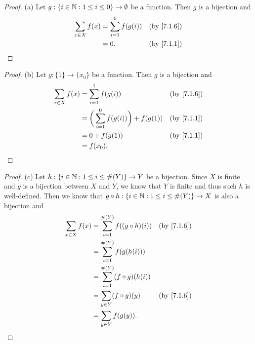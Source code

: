 \begin{proof}{(a)}
  Let \(g : \{i \in \mathbb{N} : 1 \leq i \leq 0\} \to \emptyset\) be a function.
  Then \(g\) is a bijection and
  \begin{align*}
    \sum_{x \in X} f(x) & = \sum_{i = 1}^0 f(g(i)) & \text{(by \cref{7.1.6})} \\
                        & = 0.                     & \text{(by \cref{7.1.1})}
  \end{align*}
\end{proof}

\begin{proof}{(b)}
  Let \(g : \{1\} \to \{x_0\}\) be a function.
  Then \(g\) is a bijection and
  \begin{align*}
    \sum_{x \in X} f(x) & = \sum_{i = 1}^1 f(g(i))                       & \text{(by \cref{7.1.6})} \\
                        & = \bigg(\sum_{i = 1}^0 f(g(i))\bigg) + f(g(1)) & \text{(by \cref{7.1.1})} \\
                        & = 0 + f(g(1))                                  & \text{(by \cref{7.1.1})} \\
                        & = f(x_0).
  \end{align*}
\end{proof}

\begin{proof}{(c)}
  Let \(h : \{i \in \mathbb{N} : 1 \leq i \leq \#(Y)\} \to Y\) be a bijection.
  Since \(X\) is finite and \(g\) is a bijection between \(X\) and \(Y\), we know that \(Y\) is finite and thus such \(h\) is well-defined.
  Then we know that \(g \circ h : \{i \in \mathbb{N} : 1 \leq i \leq \#(Y)\} \to X\) is also a bijection and
  \begin{align*}
    \sum_{x \in X} f(x) & = \sum_{i = 1}^{\#(Y)} f((g \circ h)(i)) & \text{(by \cref{7.1.6})} \\
                        & = \sum_{i = 1}^{\#(Y)} f(g(h(i)))                                   \\
                        & = \sum_{i = 1}^{\#(Y)} (f \circ g)(h(i))                            \\
                        & = \sum_{y \in Y} (f \circ g)(y)          & \text{(by \cref{7.1.6})} \\
                        & = \sum_{y \in Y} f(g(y)).
  \end{align*}
\end{proof}

